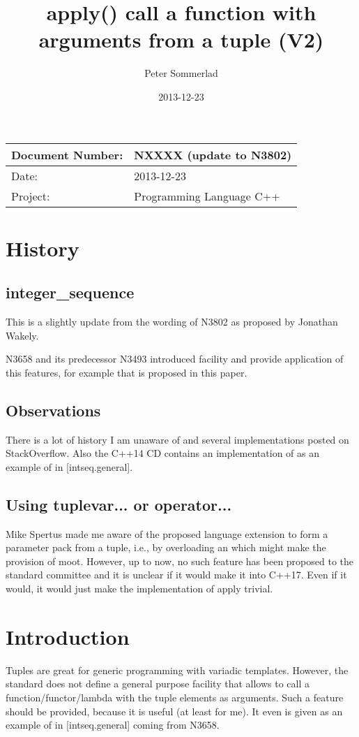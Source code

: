 \documentclass[ebook,11pt,article]{memoir}
\title{apply() call a function with arguments from a tuple (V2)
}
\author{Peter Sommerlad}
\date{2013-12-23}                                           %
\begin{document}
\maketitle
\begin{tabular}[t]{|l|l|}\hline 
Document Number: & NXXXX (update to N3802) \\\hline
Date: & 2013-12-23 \\\hline
Project: & Programming Language C++\\\hline 
\end{tabular}
\chapter{History}
\section{integer_sequence}
This is a slightly update from the wording of N3802 as proposed by Jonathan Wakely.

N3658 and its predecessor N3493 introduced  facility and provide application of this features, for example  that is proposed in this paper.
\section{Observations}
There is a lot of history I am unaware of and several implementations posted on StackOverflow. Also the C++14 CD contains an implementation of  as an example of  in [intseq.general].
\section{Using tuplevar... or operator...}
Mike Spertus made me aware of the proposed language extension to form a parameter pack from a tuple, i.e., by overloading an  which might make the provision of  moot. However, up to now, no such feature has been proposed to the standard committee and it is unclear if it would make it into C++17. Even if it would, it would just make the implementation of apply trivial.
\chapter{Introduction}
Tuples are great for generic programming with variadic templates. However, the standard does not define a general purpose facility that allows to call a function/functor/lambda with the tuple elements as arguments. Such a feature should be provided, because it is useful (at least for me). It even is given as an example of  in [intseq.general] coming from N3658. 
\end{document}
